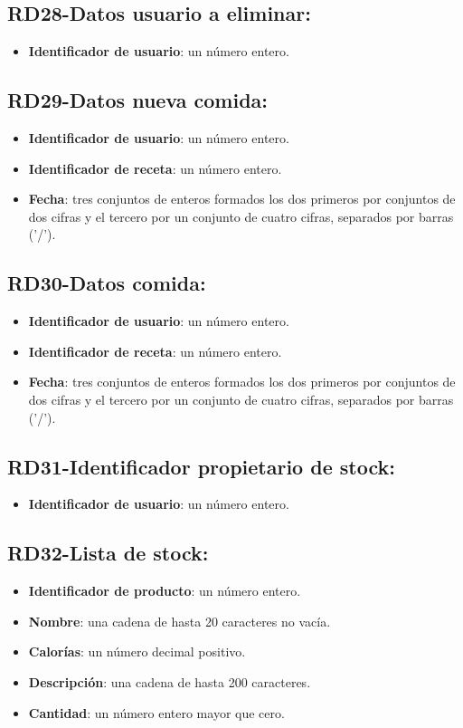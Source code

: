\documentclass[a4paper,12pt]{report}
\begin{document}
\subsection{RD28-Datos usuario a eliminar:}
\label{sec-2-1-28}
\begin{itemize}
\item \textbf{Identificador de usuario}: un número entero.
\end{itemize}
\subsection{RD29-Datos nueva comida:}
\label{sec-2-1-29}
\begin{itemize}
\item \textbf{Identificador de usuario}: un número entero.
\item \textbf{Identificador de receta}: un número entero.
\item \textbf{Fecha}: tres conjuntos de enteros formados los dos primeros por conjuntos de dos cifras y el                 tercero por un conjunto de cuatro cifras, separados por barras ('/').
\end{itemize}
\subsection{RD30-Datos comida:}
\label{sec-2-1-30}
\begin{itemize}
\item \textbf{Identificador de usuario}: un número entero.
\item \textbf{Identificador de receta}: un número entero.
\item \textbf{Fecha}: tres conjuntos de enteros formados los dos primeros por conjuntos de dos cifras y el                 tercero por un conjunto de cuatro cifras, separados por barras ('/').
\end{itemize}
\subsection{RD31-Identificador propietario de stock:}
\label{sec-2-1-31}
\begin{itemize}
\item \textbf{Identificador de usuario}: un número entero.
\end{itemize}
\subsection{RD32-Lista de stock:}
\label{sec-2-1-32}
\begin{itemize}
\item \textbf{Identificador de producto}: un número entero.
\item \textbf{Nombre}: una cadena de hasta 20 caracteres no vacía.
\item \textbf{Calorías}: un número decimal positivo.
\item \textbf{Descripción}: una cadena de hasta 200 caracteres.
\item \textbf{Cantidad}: un número entero mayor que cero.
\end{itemize}
\end{document}
